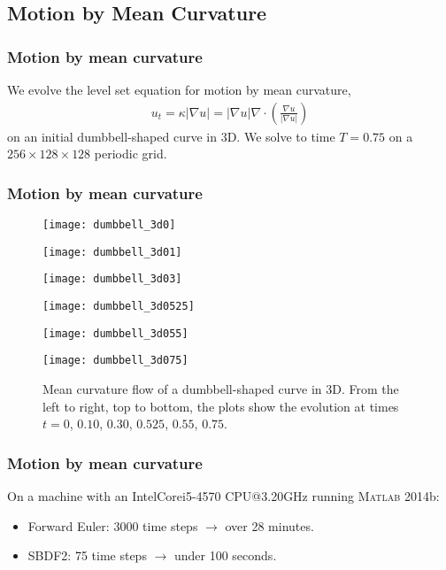 \documentclass[hyperref={pdfpagelabels=false}]{beamer}
\begin{document}
\subsection{Motion by Mean Curvature}
\begin{frame}
	\frametitle{Motion by mean curvature}
We evolve the level set equation for motion by mean curvature, 
\begin{align*}
u_t 
= \kappa \left\vert \nabla u \right\vert 
= \left\vert \nabla u \right\vert \nabla \cdot \left(\frac{\nabla u}{\left\vert \nabla u \right\vert} 
\right)
\end{align*}
on an initial dumbbell-shaped curve in 3D. We solve to time $T=0.75$ on a $256\times 128\times 128$ periodic grid.
\end{frame}
\begin{frame}
	\frametitle{Motion by mean curvature} 
\begin{figure}[htb!]
        \centering
\begin{minipage}{0.30\textwidth}
        \texttt{[image: dumbbell\_3d0]}
\end{minipage}%
\begin{minipage}{0.30\textwidth}
        \texttt{[image: dumbbell\_3d01]}
\end{minipage}%
\begin{minipage}{0.30\textwidth}
        \texttt{[image: dumbbell\_3d03]}
\end{minipage}
\begin{minipage}{0.30\textwidth}
        \texttt{[image: dumbbell\_3d0525]}
\end{minipage}%
\begin{minipage}{0.30\textwidth}
        \texttt{[image: dumbbell\_3d055]}
\end{minipage}%
\begin{minipage}{0.30\textwidth}
        \texttt{[image: dumbbell\_3d075]}
\end{minipage}
\caption[Mean curvature flow of a dumbbell-shaped curve in 3D]{Mean curvature flow of a dumbbell-shaped curve in 3D. From the left to right, top to bottom, the plots show the evolution at times $t=0$, $0.10$, $0.30$, $0.525$, $0.55$, $0.75$.}
\end{figure}
\end{frame}
\begin{frame}
        \frametitle{Motion by mean curvature}
On a machine with an Intel\textsuperscript{\textregistered}Core\textsuperscript{\texttrademark}i5-4570 CPU@3.20GHz running \textsc{Matlab} 2014b: 
\begin{itemize}
	\item Forward Euler: 3000 time steps $\to$ over 28 minutes.
	
	\item SBDF2: 75 time steps $\to$ under 100 seconds.
\end{itemize}
\end{frame}
\end{document}
